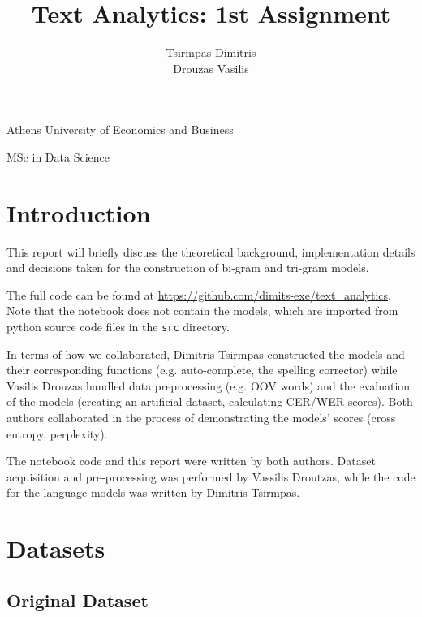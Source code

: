 \documentclass[11pt, a4paper]{article}
\title{\Huge Text Analytics: 1st Assignment}
\author{\LARGE Tsirmpas Dimitris\\\LARGE Drouzas Vasilis}
\begin{document}
	
	\begin{titlepage}
		\maketitle
		\begin{center}
			
			\large Athens University of Economics and Business
			
			\large MSc in Data Science
			
		\end{center}
		
	\end{titlepage}
	
	\tableofcontents
	\newpage	
	
	\section{Introduction}
	
	This report will briefly discuss the theoretical background, implementation details and decisions taken for the construction of bi-gram and tri-gram models.
	
 
	The full code can be found at \url{https://github.com/dimits-exe/text_analytics}. Note that the notebook does not contain the models, which are imported from python source code files in the \texttt{src} directory.

    In terms of how we collaborated, Dimitris Tsirmpas constructed the models and their corresponding functions (e.g. auto-complete, the spelling corrector) while Vasilis Drouzas handled data preprocessing (e.g. OOV words) and the evaluation of the models (creating an artificial dataset, calculating CER/WER scores). Both authors collaborated in the process of demonstrating the models' scores (cross entropy, perplexity). 
    
    The notebook code and this report were written by both authors. Dataset acquisition and pre-processing was performed by Vassilis Droutzas, while the code for the language models was written by Dimitris Tsirmpas.
	
	\section{Datasets}
	
	
	\subsection{Original Dataset}
	
\end{document}
